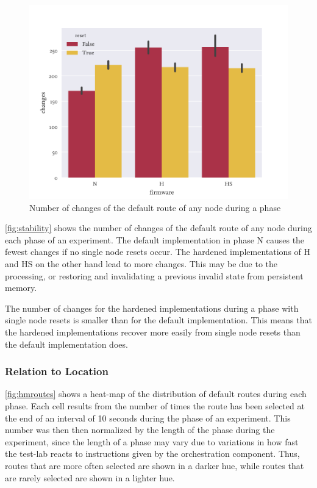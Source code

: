 \begin{figure}
  \centering
  \includegraphics[height=.3\textheight]{../images/stability.pdf}
  \caption{Number of changes of the default route of any node during a phase}
  \label{fig:stability}
\end{figure}

\autoref{fig:stability} shows the number of changes of the default route of any
node during each phase of an experiment. The default implementation in phase N
causes the fewest changes if no single node resets occur. The hardened
implementations of H and HS on the other hand lead to more changes. This may be
due to the processing, or restoring and invalidating a previous invalid state from
persistent memory.

The number of changes for the hardened implementations during a phase with
single node resets is smaller than for the default implementation. This means
that the hardened implementations recover more easily from single node resets
than the default implementation does.

\subsubsection{Relation to Location}

\autoref{fig:hmroutes} shows a heat-map of the distribution of default routes
during each phase. Each cell results from the number of times the route has been
selected at the end of an interval of 10 seconds during the phase of an
experiment. This number was then then normalized by the length of the phase
during the experiment, since the length of a phase may vary due to variations in
how fast the test-lab reacts to instructions given by the orchestration
component. Thus, routes that are more often selected are shown in a darker hue,
while routes that are rarely selected are shown in a lighter hue. 

